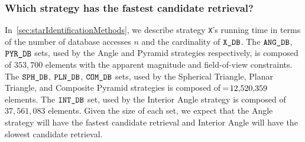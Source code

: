 \begin{table}
\end{table}

\subsubsection{Which strategy has the fastest candidate retrieval?}
In~\autoref{sec:starIdentificationMethods}, we describe strategy \texttt{X}'s running time in terms of the number of database accesses $n$ and the cardinality of $\texttt{X\_DB}$.
The $\texttt{ANG\_DB}$, $\texttt{PYR\_DB}$ sets, used by the Angle and Pyramid strategies respectively, is composed of $353{,}700$ elements with the apparent magnitude and field-of-view constraints.
The $\texttt{SPH\_DB}$, $\texttt{PLN\_DB}$, $\texttt{COM\_DB}$ sets, used by the Spherical Triangle, Planar Triangle, and Composite Pyramid strategies is composed of $\!=\! 12{,}520{,}359$ elements.
The $\texttt{INT\_DB}$ set, used by the Interior Angle strategy is composed of $37{,}561{,}083$ elements.
Given the size of each set, we expect that the Angle strategy will have the fastest candidate retrieval and Interior Angle will have the slowest candidate retrieval.


